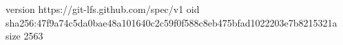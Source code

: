 version https://git-lfs.github.com/spec/v1
oid sha256:47f9a74c5da0bae48a101640c2c59f0f588c8eb475bfad1022203e7b8215321a
size 2563
